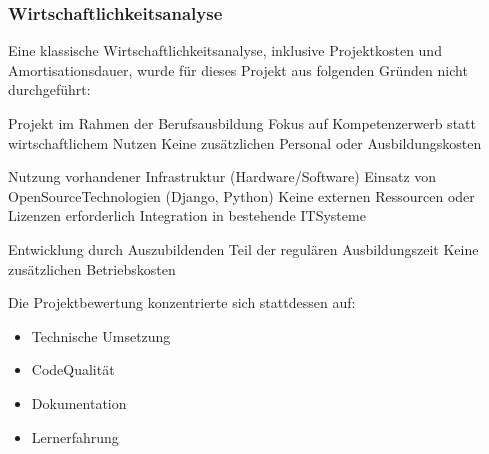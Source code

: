 \documentclass[a4paper,12pt,ngerman]{sphinxmanual}
\begin{document}
\subsubsection{Wirtschaftlichkeitsanalyse}
\label{\detokenize{sections/projektplanung_analyse:wirtschaftlichkeitsanalyse}}
\sphinxAtStartPar
Eine klassische Wirtschaftlichkeitsanalyse, inklusive Projektkosten und Amortisationsdauer,
wurde für dieses Projekt aus folgenden Gründen nicht durchgeführt:

\sphinxAtStartPar
{}
\sphinxhyphen{} Projekt im Rahmen der Berufsausbildung
\sphinxhyphen{} Fokus auf Kompetenzerwerb statt wirtschaftlichem Nutzen
\sphinxhyphen{} Keine zusätzlichen Personal\sphinxhyphen{} oder Ausbildungskosten

\sphinxAtStartPar
{}
\sphinxhyphen{} Nutzung vorhandener Infrastruktur (Hardware/Software)
\sphinxhyphen{} Einsatz von Open\sphinxhyphen{}Source\sphinxhyphen{}Technologien (Django, Python)
\sphinxhyphen{} Keine externen Ressourcen oder Lizenzen erforderlich
\sphinxhyphen{} Integration in bestehende IT\sphinxhyphen{}Systeme

\sphinxAtStartPar
{}
\sphinxhyphen{} Entwicklung durch Auszubildenden
\sphinxhyphen{} Teil der regulären Ausbildungszeit
\sphinxhyphen{} Keine zusätzlichen Betriebskosten

\sphinxAtStartPar
Die Projektbewertung konzentrierte sich stattdessen auf:
\begin{itemize}
\item {} 
\sphinxAtStartPar
Technische Umsetzung

\item {} 
\sphinxAtStartPar
Code\sphinxhyphen{}Qualität

\item {} 
\sphinxAtStartPar
Dokumentation

\item {} 
\sphinxAtStartPar
Lernerfahrung

\end{itemize}
\end{document}
